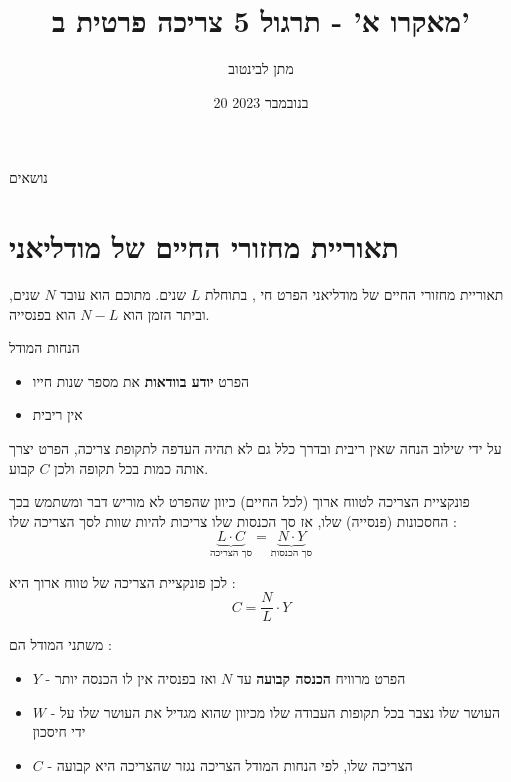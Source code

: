 \documentclass[usenames,dvipsnames]{beamer}
\title[]{{מאקרו א' - תרגול 5 צריכה פרטית ב'}}
\author{\texthebrew{ מתן לבינטוב}}
\institute[{{ אב"ג}}]{{ אוניברסיטת בן גוריון בנגב}}
\date{20 בנובמבר 2023}
\begin{document}
\begin{RTL}
\begin{frame}
\titlepage
\end{frame}

\begin{frame}{נושאים}
    \tableofcontents
\end{frame}

\section{תאוריית מחזורי החיים של מודליאני}

\begin{frame}[allowframebreaks]{תאוריית מחזורי החיים של מודליאני}
הפרט חי , בתוחלת $L$ שנים. מתוכם הוא עובד $N$ שנים, וביתר הזמן הוא $N-L$ הוא בפנסייה.
\begin{block}{הנחות המודל}
    \begin{itemize}
        \item הפרט \textbf{יודע בוודאות} את מספר שנות חייו
        \item אין ריבית
    \end{itemize}
    על ידי שילוב הנחה שאין ריבית ובדרך כלל גם לא תהיה העדפה לתקופת צריכה, הפרט יצרך אותה כמות בכל תקופה ולכן $C$ קבוע.
\end{block}

\begin{block}{פונקציית הצריכה לטווח ארוך (לכל החיים)}
    כיוון שהפרט לא מוריש דבר ומשתמש בכך החסכונות (פנסייה) שלו, אז סך הכנסות שלו צריכות להיות שוות לסך הצריכה שלו :
    \begin{equation*}
       \underbrace{ L \cdot C }_{\text{סך הצריכה}}= \underbrace{N \cdot Y }_{\text{סך הכנסות}}
    \end{equation*}    

    לכן פונקציית הצריכה של טווח ארוך היא :
    $$
    C = \frac{N}{L}\cdot Y
    $$
\end{block}
\framebreak %
משתני המודל הם :
\begin{itemize}
    \item $Y$ - הפרט מרוויח \textbf{הכנסה קבועה} עד $N$ ואז בפנסיה אין לו הכנסה יותר
    \item $W$ - העושר שלו נצבר בכל תקופות העבודה שלו מכיוון שהוא מגדיל את העושר שלו על ידי חיסכון
    \item $C$ - הצריכה שלו, לפי הנחות המודל הצריכה נגזר שהצריכה היא קבועה
\end{itemize}
\begin{flushleft}
\end{flushleft}
\end{frame}
\end{RTL}
\end{document}
